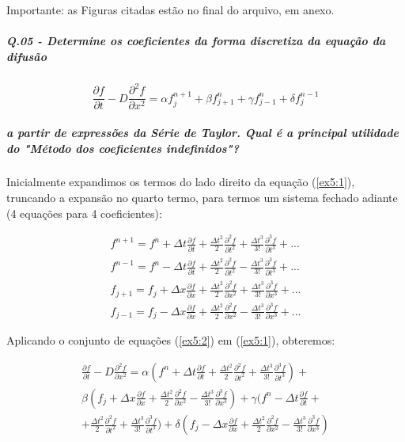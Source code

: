 \documentclass[11pt]{article}
\begin{document}
Importante: as Figuras citadas estão no final do arquivo, em anexo.

    \subparagraph{Q.05 - Determine os coeficientes da forma discretiza da
equação da
difusão}
\begin{equation}
    \frac{\partial{f}}{\partial{t}} - D\frac{\partial^2{f}}{\partial{x^2}} = \alpha f^{n+1}_{j} + \beta f^{n}_{j+1} + \gamma f^{n}_{j-1} + \delta f^{n-1}_{j}
    \label{ex5:1}
\end{equation}

\subparagraph{a partir de expressões da Série de Taylor. Qual é a
principal utilidade do "Método dos coeficientes
indefinidos"?}

Inicialmente expandimos os termos do lado direito da equação
(\ref{ex5:1}), truncando a expansão no quarto termo, para termos um
sistema fechado adiante (4 equações para 4 coeficientes):

\begin{equation}
\begin{aligned}
    f^{n+1} = f^{n} + \Delta{t}\frac{\partial{f}}{\partial{t}} + \frac{\Delta{t}^2}{2}\frac{\partial^2{f}}{\partial{t^2}} + \frac{\Delta{t}^3}{3!}\frac{\partial^3{f}}{\partial{t^3}} + ...
    \\
    f^{n-1} = f^{n} - \Delta{t}\frac{\partial{f}}{\partial{t}} + \frac{\Delta{t}^2}{2}\frac{\partial^2{f}}{\partial{t^2}} - \frac{\Delta{t}^3}{3!}\frac{\partial^3{f}}{\partial{t^3}} + ...
    \\
    f_{j+1} = f_{j} + \Delta{x}\frac{\partial{f}}{\partial{x}} + \frac{\Delta{t}^2}{2}\frac{\partial^2{f}}{\partial{x^2}} + \frac{\Delta{t}^3}{3!}\frac{\partial^3{f}}{\partial{x^3}} + ...
    \\
    f_{j-1} = f_{j} - \Delta{x}\frac{\partial{f}}{\partial{x}} + \frac{\Delta{t}^2}{2}\frac{\partial^2{f}}{\partial{x^2}} - \frac{\Delta{t}^3}{3!}\frac{\partial^3{f}}{\partial{x^3}} + ...
\end{aligned}
    \label{ex5:2}
\end{equation}

Aplicando o conjunto de equações (\ref{ex5:2}) em (\ref{ex5:1}),
obteremos:

\begin{equation}
\begin{aligned}
    \frac{\partial{f}}{\partial{t}} - D\frac{\partial^2{f}}{\partial{x^2}} = 
    \alpha (f^{n} + \Delta{t}\frac{\partial{f}}{\partial{t}} + \frac{\Delta{t}^2}{2}\frac{\partial^2{f}}{\partial{t^2}}+ \frac{\Delta{t}^3}{3!}\frac{\partial^3{f}}{\partial{t^3}}) +  \\
    \beta (f_{j} + \Delta{x}\frac{\partial{f}}{\partial{x}} + \frac{\Delta{t}^2}{2}\frac{\partial^2{f}}{\partial{x^2}}- \frac{\Delta{t}^3}{3!}\frac{\partial^3{f}}{\partial{x^3}}) + 
    \gamma (f^{n} - \Delta{t}\frac{\partial{f}}{\partial{t}} + \\ + \frac{\Delta{t}^2}{2}\frac{\partial^2{f}}{\partial{t^2}}+ \frac{\Delta{t}^3}{3!}\frac{\partial^3{f}}{\partial{t^3}}) + 
    \delta (f_{j} - \Delta{x}\frac{\partial{f}}{\partial{x}} + \frac{\Delta{t}^2}{2}\frac{\partial^2{f}}{\partial{x^2}}- \frac{\Delta{t}^3}{3!}\frac{\partial^3{f}}{\partial{x^3}})
\end{aligned}
    \label{ex5:3}
\end{equation}
\end{document}
